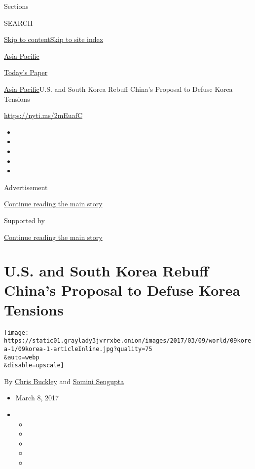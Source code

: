 Sections

SEARCH

\protect\hyperlink{site-content}{Skip to
content}\protect\hyperlink{site-index}{Skip to site index}

\href{https://www.nytimes3xbfgragh.onion/section/world/asia}{Asia
Pacific}

\href{https://myaccount.nytimes3xbfgragh.onion/auth/login?response_type=cookie\&client_id=vi}{}

\href{https://www.nytimes3xbfgragh.onion/section/todayspaper}{Today's
Paper}

\href{/section/world/asia}{Asia Pacific}\textbar{}U.S. and South Korea
Rebuff China's Proposal to Defuse Korea Tensions

\url{https://nyti.ms/2mEuafC}

\begin{itemize}
\item
\item
\item
\item
\item
\end{itemize}

Advertisement

\protect\hyperlink{after-top}{Continue reading the main story}

Supported by

\protect\hyperlink{after-sponsor}{Continue reading the main story}

\hypertarget{us-and-south-korea-rebuff-chinas-proposal-to-defuse-korea-tensions}{%
\section{U.S. and South Korea Rebuff China's Proposal to Defuse Korea
Tensions}\label{us-and-south-korea-rebuff-chinas-proposal-to-defuse-korea-tensions}}

\texttt{[image: https://static01.graylady3jvrrxbe.onion/images/2017/03/09/world/09korea-1/09korea-1-articleInline.jpg?quality=75\\\&auto=webp\\\&disable=upscale]}

By \href{http://www.nytimes3xbfgragh.onion/by/chris-buckley}{Chris
Buckley} and
\href{http://www.nytimes3xbfgragh.onion/by/somini-sengupta}{Somini
Sengupta}

\begin{itemize}
\item
  March 8, 2017
\item
  \begin{itemize}
  \item
  \item
  \item
  \item
  \item
  \end{itemize}
\end{itemize}

